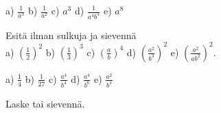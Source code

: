 \begin{tehtavasivu}
\begin{tehtava}
        \begin{vastaus}
            a) $\frac{1}{a^3}$ 
            b) $\frac{1}{a^2}$ 
            c) $a^3$ 
            d) $\frac{1}{a^4b^3}$ 
            e) $a^8$
        \end{vastaus}
    \end{tehtava}
    
    
    
    \begin{tehtava}
        Esitä ilman sulkuja ja sievennä \\
        a) $(\frac{1}{2})^2$ 
        b) $(\frac{1}{3})^3$ 
        c) $(\frac{a}{b})^4$ 
        d) $(\frac{a^2}{b^3})^2$ 
        e) $\left(\frac{a^2}{ab^2}\right)^2$.
        
        \begin{vastaus}
            a) $\frac{1}{4}$ 
            b) $\frac{1}{27}$ 
            c) $\frac{a^4}{b^4}$ 
            d) $\frac{a^4}{b^6}$ 
            e) $\frac{a^2}{b^4}$
        \end{vastaus}
    \end{tehtava}

Laske tai sievennä.

    \begin{tehtava}%
        \begin{vastaus}
        \end{vastaus}
    \end{tehtava}    
    
         
    
    \begin{tehtava}%
        \begin{vastaus}
        \end{vastaus}
    \end{tehtava}     



\end{tehtavasivu}
